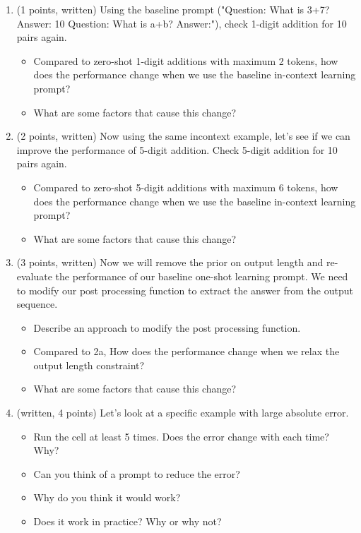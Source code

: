\documentclass{article}
\theoremstyle{case}
\theoremstyle{definition}
\begin{document}
\begin{enumerate}[label=\alph*.]

\item (1 points, written) Using the baseline prompt ("Question: What is 3+7? Answer: 10 Question: What is a+b? Answer:"), check 1-digit addition for 10 pairs again. 
\begin{itemize}
    \item Compared to zero-shot 1-digit additions with maximum 2 tokens, how does the performance change when we use the baseline in-context learning prompt? 
    \item What are some factors that cause this change?
\end{itemize}
\newpage
\item (2 points, written) Now using the same incontext example, let's see if we can improve the performance of 5-digit addition. Check 5-digit addition for 10 pairs again.
\begin{itemize}
    \item Compared to zero-shot 5-digit additions with maximum 6 tokens, how does the performance change when we use the baseline in-context learning prompt?
    \item What are some factors that cause this change?
\end{itemize}
\newpage

\item (3 points, written) Now we will remove the prior on output length and re-evaluate the performance of our baseline one-shot learning prompt. We need to modify our post processing function to extract the answer from the output sequence. 
\begin{itemize}
    \item Describe an approach to modify the post processing function.
    \item Compared to 2a, How does the performance change when we relax the output length constraint? 
    \item  What are some factors that cause this change?
\end{itemize}

\newpage
\item (written, 4 points) Let's look at a specific example with large absolute error. 
\begin{itemize}
    \item Run the cell at least 5 times. Does the error change with each time? Why?
    \item Can you think of a prompt to reduce the error? 
    \item Why do you think it would work?
    \item Does it work in practice? Why or why not?
\end{itemize}
\end{enumerate}
\end{document}
